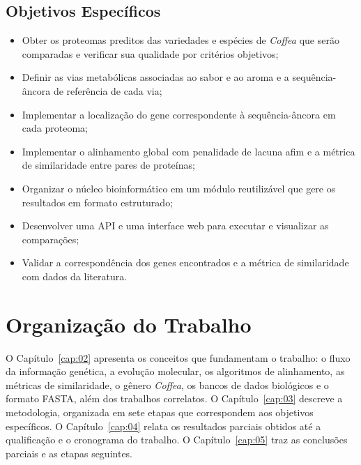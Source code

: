 \subsection{Objetivos Específicos}

\begin{itemize}
	\item Obter os proteomas preditos das variedades e espécies de \textit{Coffea} que serão comparadas e verificar sua qualidade por critérios objetivos;
	\item Definir as vias metabólicas associadas ao sabor e ao aroma e a sequência-âncora de referência de cada via;
	\item Implementar a localização do gene correspondente à sequência-âncora em cada proteoma;
	\item Implementar o alinhamento global com penalidade de lacuna afim e a métrica de similaridade entre pares de proteínas;
	\item Organizar o núcleo bioinformático em um módulo reutilizável que gere os resultados em formato estruturado;
	\item Desenvolver uma API e uma interface web para executar e visualizar as comparações;
	\item Validar a correspondência dos genes encontrados e a métrica de similaridade com dados da literatura.
\end{itemize}

\section{Organização do Trabalho}

O Capítulo~\ref{cap:02} apresenta os conceitos que fundamentam o trabalho: o fluxo da informação genética, a evolução molecular, os algoritmos de alinhamento, as métricas de similaridade, o gênero \textit{Coffea}, os bancos de dados biológicos e o formato FASTA, além dos trabalhos correlatos. O Capítulo~\ref{cap:03} descreve a metodologia, organizada em sete etapas que correspondem aos objetivos específicos. O Capítulo~\ref{cap:04} relata os resultados parciais obtidos até a qualificação e o cronograma do trabalho. O Capítulo~\ref{cap:05} traz as conclusões parciais e as etapas seguintes.
